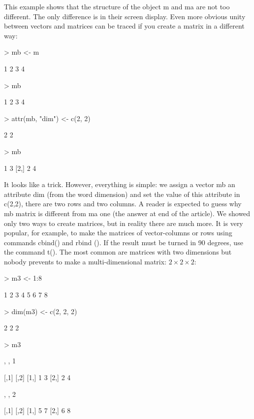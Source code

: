 \documentclass[a4paper,11pt]{scrartcl}
\begin{document}
This example shows that the structure of the object m and ma are not too different. The only difference is in their screen display. Even more obvious unity between vectors and matrices can be traced if you create a matrix in a different way:
\begin{Schunk}
\begin{Sinput}
> mb <- m
\end{Sinput}
\begin{Soutput}
[1] 1 2 3 4
\end{Soutput}
\begin{Sinput}
> mb
\end{Sinput}
\begin{Soutput}
[1] 1 2 3 4
\end{Soutput}
\begin{Sinput}
> attr(mb, "dim") <- c(2, 2)
\end{Sinput}
\begin{Soutput}
[1] 2 2
\end{Soutput}
\begin{Sinput}
> mb
\end{Sinput}
\begin{Soutput}
     [,1] [,2]
[1,]    1    3
[2,]    2    4
\end{Soutput}
\end{Schunk}
It looks like a trick. However, everything is simple: we assign a vector mb an attribute dim (from the word dimension) and set the value of this attribute in c(2,2), there are two rows and two columns. A reader is expected to guess why mb matrix is different from ma one (the answer at end of the article). 
We showed only two ways to create matrices, but in reality there are much more. It is very popular, for example, to make the matrices of vector-columns or rows using commands cbind() and rbind (). If the result must be turned in 90 degrees, use the command t().
The most common are matrices with two dimensions but nobody prevents to make a multi-dimensional matrix:
 \(2\times2\times2\):
\begin{Schunk}
\begin{Sinput}
> m3 <- 1:8
\end{Sinput}
\begin{Soutput}
[1] 1 2 3 4 5 6 7 8
\end{Soutput}
\begin{Sinput}
> dim(m3) <- c(2, 2, 2)
\end{Sinput}
\begin{Soutput}
[1] 2 2 2
\end{Soutput}
\begin{Sinput}
> m3
\end{Sinput}
\begin{Soutput}
, , 1

     [,1] [,2]
[1,]    1    3
[2,]    2    4

, , 2

     [,1] [,2]
[1,]    5    7
[2,]    6    8
\end{Soutput}
\end{Schunk}
\end{document}
